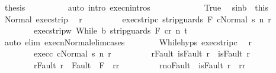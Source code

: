 \begin{isabellebody}
\ {\isacharquery}thesis\isanewline
\ \ \ \ \ \ \ \ \isamarkupfalse%
\ {\isacharparenleft}auto\ intro{\isacharcolon}\ execn{\isachardot}intros{\isacharparenright}\isanewline
\ \ \ \ \isamarkupfalse%
\isanewline
\ \ \ \ \ \ \isamarkupfalse%
\ True\ \isamarkupfalse%
\ s{\isacharprime}{\isacharunderscore}in{\isacharunderscore}b\ {\isacharequal}\ this\isanewline
\ \ \ \ \ \ \isamarkupfalse%
\ Normal\ exec{\isacharunderscore}strip\ \isamarkupfalse%
\ r\ \isanewline
\ \ \ \ \ \ \ \ exec{\isacharunderscore}strip{\isacharunderscore}c{\isacharcolon}\ {\isachardoublequoteopen}{\isasymGamma}{\isasymturnstile}{\isasymlangle}strip{\isacharunderscore}guards\ F\ c{\isacharcomma}Normal\ s{\isacharprime}{\isasymrangle}\ {\isacharequal}n{\isasymRightarrow}\ r{\isachardoublequoteclose}\ \isanewline
\ \ \ \ \ \ \ \ exec{\isacharunderscore}strip{\isacharunderscore}w{\isacharcolon}\ {\isachardoublequoteopen}{\isasymGamma}{\isasymturnstile}{\isasymlangle}While\ b\ {\isacharparenleft}strip{\isacharunderscore}guards\ F\ c{\isacharparenright}{\isacharcomma}r{\isasymrangle}\ {\isacharequal}n{\isasymRightarrow}\ t{\isachardoublequoteclose}\isanewline
\ \ \ \ \ \ \ \ \isamarkupfalse%
\ {\isacharparenleft}auto\ elim{\isacharcolon}\ execn{\isacharunderscore}Normal{\isacharunderscore}elim{\isacharunderscore}cases{\isacharparenright}\isanewline
\ \ \ \ \ \ \isamarkupfalse%
\ While{\isachardot}hyps\ exec{\isacharunderscore}strip{\isacharunderscore}c\ \isamarkupfalse%
\ r{\isacharprime}\ \ \isanewline
\ \ \ \ \ \ \ \ exec{\isacharunderscore}c{\isacharcolon}\ {\isachardoublequoteopen}{\isasymGamma}{\isasymturnstile}{\isasymlangle}c{\isacharcomma}Normal\ s{\isacharprime}{\isasymrangle}\ {\isacharequal}n{\isasymRightarrow}\ r{\isacharprime}{\isachardoublequoteclose}\ \isanewline
\ \ \ \ \ \ \ \ r{\isacharunderscore}Fault{\isacharcolon}\ {\isachardoublequoteopen}isFault\ r\ {\isasymlongrightarrow}\ isFault\ r{\isacharprime}{\isachardoublequoteclose}\ \isanewline
\ \ \ \ \ \ \ \ r{\isacharprime}{\isacharunderscore}Fault{\isacharcolon}\ {\isachardoublequoteopen}r{\isacharprime}\ {\isasymin}\ Fault\ {\isacharbackquote}\ {\isacharparenleft}{\isacharminus}F{\isacharparenright}\ {\isasymlongrightarrow}\ r{\isacharprime}{\isacharequal}r{\isachardoublequoteclose}\ \isanewline
\ \ \ \ \ \ \ \ r{\isacharprime}{\isacharunderscore}noFault{\isacharcolon}\ {\isachardoublequoteopen}{\isasymnot}\ isFault\ r{\isacharprime}\ {\isasymlongrightarrow}\ r{\isacharprime}{\isacharequal}r{\isachardoublequoteclose}\isanewline

\end{isabellebody}
